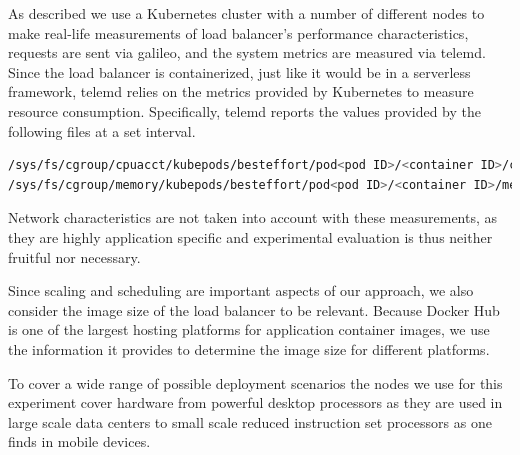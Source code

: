 \documentclass[draft,final]{vutinfth} %
\begin{document}
As described we use a Kubernetes cluster with a number of different nodes to make real-life measurements of load balancer's performance characteristics, requests are sent via galileo\cite{galileo-github}\cite{operating-energy-aware-galileo}, and the system metrics are measured via telemd\cite{telemd-github}.
Since the load balancer is containerized, just like it would be in a serverless framework, telemd relies on the metrics provided by Kubernetes to measure resource consumption.
Specifically, telemd reports the values provided by the following files at a set interval\cite{telemd-github}.
\begin{lstlisting}[language=Bash]
/sys/fs/cgroup/cpuacct/kubepods/besteffort/pod<pod ID>/<container ID>/cpuacct.usage
/sys/fs/cgroup/memory/kubepods/besteffort/pod<pod ID>/<container ID>/memory.stat
\end{lstlisting}
Network characteristics are not taken into account with these measurements, as they are highly application specific and experimental evaluation is thus neither fruitful nor necessary.

Since scaling and scheduling are important aspects of our approach, we also consider the image size of the load balancer to be relevant.
Because Docker Hub is one of the largest hosting platforms for application container images, we use the information it provides\cite{traefik-dockerhub} to determine the image size for different platforms.

To cover a wide range of possible deployment scenarios the nodes we use for this experiment cover hardware from powerful desktop processors as they are used in large scale data centers to small scale reduced instruction set processors as one finds in mobile devices.
\end{document}
